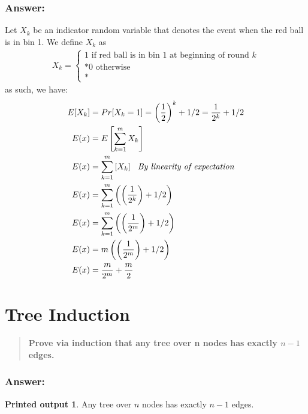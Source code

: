 \documentclass[titlepage]{article}
\theoremstyle{definition}
\newtheorem{name}{Printed output}
\begin{document}
    \subsubsection{Answer:}
      Let $X_k$ be an indicator random variable that denotes the event when the red
      ball is in bin 1. We define $X_k$ as 
      \begin{align*}
        X_k = \begin{cases} 1 \text{ if red ball is in bin 1 at beginning of round }k \\*
                            0 \text{ otherwise }\\*
        \end{cases}
      \end{align*}
      as such, we have:
      \begin{align*}
        E[X_k] &= Pr[X_k = 1] = \left(\frac{1}{2}\right)^k + 1/2  = \frac{1}{2^k} + 1/2 \\*
        E(x) &= E\left[ \sum_{k=1}^m X_k \right] \\*
        E(x) &= \sum_{k=1}^m \left[X_k \right] \text{ \emph{ By linearity of expectation}}\\*
        E(x) &= \sum_{k=1}^m \left( \left( \frac{1}{2^k}\right) + 1/2 \right) \\*
        E(x) &= \sum_{k=1}^m \left( \left( \frac{1}{2^m}\right) + 1/2 \right) \\*
        E(x) &= m \left( \left( \frac{1}{2^m}\right) + 1/2 \right) \\*
        E(x) &= \frac{m}{2^m} + \frac{m}{2}
      \end{align*}


\section{Tree Induction}
\begin{quote}
  \textbf{Prove via induction that any tree over n nodes has exactly $n-1$
  edges. }
\end{quote}

\subsubsection{Answer:}

\newtheorem{mydef}{Theorem}

\begin{name}
  Any tree over $n$ nodes has exactly $n-1$ edges.
\end{name}
\end{document}
